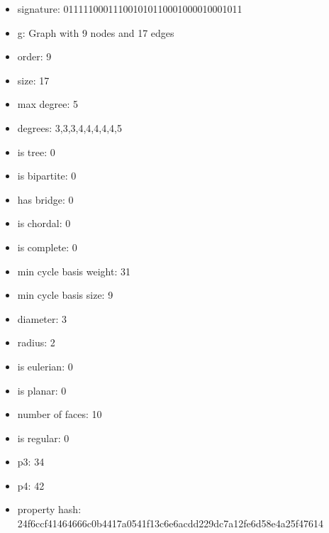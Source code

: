 \newpage
\begin{figure}
\end{figure}
\begin{itemize}
\item signature: 011111000111001010110001000010001011
\item g: Graph with 9 nodes and 17 edges
\item order: 9
\item size: 17
\item max degree: 5
\item degrees: 3,3,3,4,4,4,4,4,5
\item is tree: 0
\item is bipartite: 0
\item has bridge: 0
\item is chordal: 0
\item is complete: 0
\item min cycle basis weight: 31
\item min cycle basis size: 9
\item diameter: 3
\item radius: 2
\item is eulerian: 0
\item is planar: 0
\item number of faces: 10
\item is regular: 0
\item p3: 34
\item p4: 42
\item property hash: 24f6ccf41464666c0b4417a0541f13c6e6acdd229dc7a12fe6d58e4a25f47614
\end{itemize}
